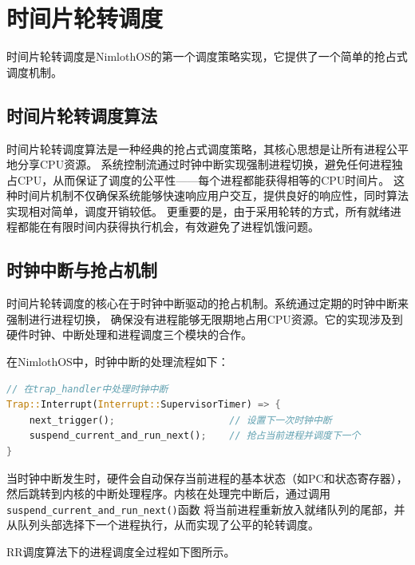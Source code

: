 \section{时间片轮转调度}

时间片轮转调度是NimlothOS的第一个调度策略实现，它提供了一个简单的抢占式调度机制。

\subsection{时间片轮转调度算法}

时间片轮转调度算法是一种经典的抢占式调度策略，其核心思想是让所有进程公平地分享CPU资源。
系统控制流通过时钟中断实现强制进程切换，避免任何进程独占CPU，从而保证了调度的公平性——每个进程都能获得相等的CPU时间片。
这种时间片机制不仅确保系统能够快速响应用户交互，提供良好的响应性，同时算法实现相对简单，调度开销较低。
更重要的是，由于采用轮转的方式，所有就绪进程都能在有限时间内获得执行机会，有效避免了进程饥饿问题。

\subsection{时钟中断与抢占机制}

时间片轮转调度的核心在于时钟中断驱动的抢占机制。系统通过定期的时钟中断来强制进行进程切换，
确保没有进程能够无限期地占用CPU资源。它的实现涉及到硬件时钟、中断处理和进程调度三个模块的合作。

在NimlothOS中，时钟中断的处理流程如下：

\begin{lstlisting}[language=Rust,caption={时钟中断处理}, label={lst:timer-interrupt}]
// 在trap_handler中处理时钟中断
Trap::Interrupt(Interrupt::SupervisorTimer) => {
    next_trigger();                    // 设置下一次时钟中断
    suspend_current_and_run_next();    // 抢占当前进程并调度下一个
}
\end{lstlisting}

当时钟中断发生时，硬件会自动保存当前进程的基本状态（如PC和状态寄存器），
然后跳转到内核的中断处理程序。内核在处理完中断后，通过调用\lstinline[language=Rust]{suspend_current_and_run_next()}函数
将当前进程重新放入就绪队列的尾部，并从队列头部选择下一个进程执行，从而实现了公平的轮转调度。

RR调度算法下的进程调度全过程如下图所示。

